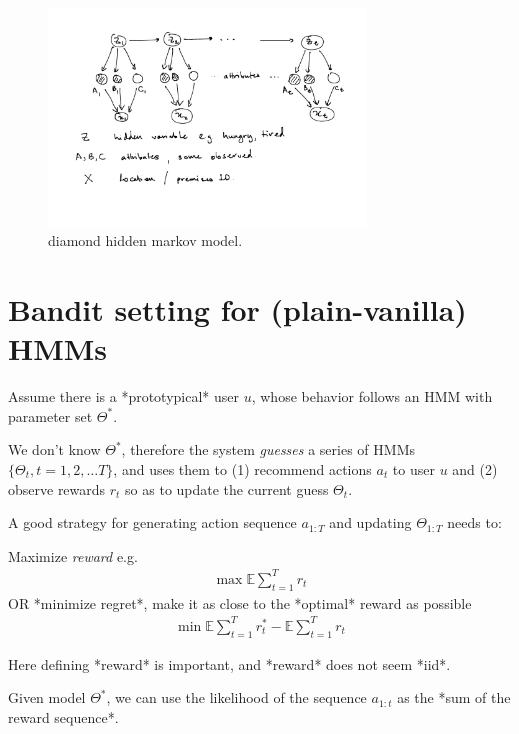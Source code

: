 \documentclass[a4paper,12pt]{article}
\begin{document}
\begin{figure}[!h]
\centering \includegraphics[width=0.75\textwidth]{figs/diahmm} 
\caption{diamond hidden markov model. \label{fig:diahmm}}
\end{figure}



\section{Bandit setting for (plain-vanilla) HMMs}

Assume there is a *prototypical* user $u$, whose behavior follows an HMM with parameter 
set $\Theta^*$. 

We don't know $\Theta^*$, therefore the system {\em guesses} a series of HMMs 
$\{ \Theta_t, t=1,2,\ldots T \}$, and uses them to (1) recommend actions $a_t$ to user $u$ and (2) observe rewards $r_t$ so as to update the current guess $\Theta_t$.  

A good strategy for generating action sequence $a_{1:T}$ and updating $\Theta_{1:T}$ needs to:

 Maximize {\em reward} e.g.
\begin{align}
  \max {\mathbb E} \sum_{t=1}^T r_t
\end{align} 
  OR *minimize regret*, make it as close to the *optimal* reward as possible
\begin{align}
  \min {\mathbb E}\sum_{t=1}^T r^*_t - {\mathbb E} \sum_{t=1}^T r_t
\end{align} 


Here defining *reward* is important, and *reward* does not seem *iid*. 

Given model $\Theta^*$, we can use the likelihood of 
the sequence $a_{1:t}$ as the *sum of the reward sequence*. 
\end{document}
